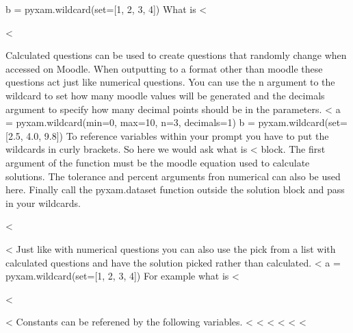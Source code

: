 \documentclass[12pt]{exam}
\begin{document}
\begin{questions}
b = pyxam.wildcard(set=[1, 2, 3, 4])
                What is <%
                \begin{solution}
                    <%
                \end{solution}
                Calculated questions can be used to create questions that randomly change when accessed on Moodle. When
                outputting to a format other than moodle these questions act just like numerical questions. You can
                use the n argument to the wildcard to set how many moodle values will be generated and the decimals
                argument to specify how many decimal points should be in the parameters.
<%
a = pyxam.wildcard(min=0, max=10, n=3, decimals=1)
b = pyxam.wildcard(set=[2.5, 4.0, 9.8])
                To reference variables within your prompt you have to put the wildcards in curly brackets. So here we
                would ask what is <%
                block. The first argument of the function must be the moodle equation used to calculate solutions.
                The tolerance and percent arguments fron numerical can also be used here. Finally call the pyxam.dataset
                function outside the solution block and pass in your wildcards.
                \begin{solution}
                    <%
                \end{solution}
                <%
                Just like with numerical questions you can also use the pick from a list with calculated questions and
                have the solution picked rather than calculated.
<%
a = pyxam.wildcard(set=[1, 2, 3, 4])
                For example what is <%
                \begin{solution}
                    <%
                \end{solution}
                <%
                Constants can be referened by the following variables.
                <%
                <%
                <%
                <%
                <%
                <%
        \end{questions}
    
\end{document}
